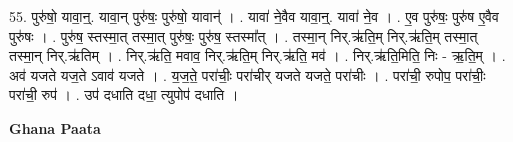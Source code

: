 \documentclass[17pt]{extarticle}
\begin{document}
55. पुरु॑षो॒ यावा॒न्॒. यावा॒न् पुरु॑षः॒ पुरु॑षो॒ यावान्॑ । . यावा॑ ने॒वैव यावा॒न्॒. यावा॑ ने॒व । . ए॒व पुरु॑षः॒ पुरु॑ष ए॒वैव पुरु॑षः । . पुरु॑ष॒ स्तस्मा॒त् तस्मा॒त् पुरु॑षः॒ पुरु॑ष॒ स्तस्मा᳚त् । . तस्मा॒न् निर्.ऋ॑ति॒म् निर्.ऋ॑ति॒म् तस्मा॒त् तस्मा॒न् निर्.ऋ॑तिम् । . निर्.ऋ॑ति॒ मवाव॒ निर्.ऋ॑ति॒म् निर्.ऋ॑ति॒ मव॑ । . निर्.ऋ॑ति॒मिति॒ निः - ऋ॒ति॒म् । . अव॑ यजते यज॒ते ऽवाव॑ यजते । . य॒ज॒ते॒ परा॑चीः॒ परा॑चीर् यजते यजते॒ परा॑चीः । . परा॑ची॒ रुपोप॒ परा॑चीः॒ परा॑ची॒ रुप॑ । . उप॑ दधाति दधा॒ त्युपोप॑ दधाति । \newline

\textbf{Ghana Paata } \newline
\end{document}
